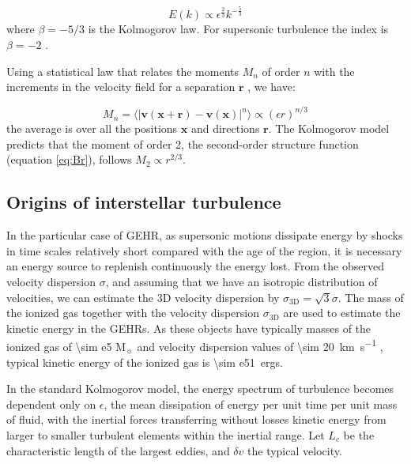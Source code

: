 \documentclass[fleqn,usenatbib, useAMS, a4paper]{mnras}
\begin{document}
\begin{equation}\label{eq:kolmogorov-law}
E(k) \propto \epsilon^\frac{2}{3} k^{-\frac{5}{3}}
\end{equation}
%
where \(\beta = -5 / 3\) is the Kolmogorov law.
For supersonic turbulence the index is $\beta=-2$ \citep{burg}. 

Using a statistical law that relates the moments \(M_n\) of order \(n\) with the increments in the velocity field for a separation \(\boldsymbol{r}\) \citep{Leqism}, we have:

\begin{equation}\label{eq:velocity-moments}
M_n = \langle \vert \boldsymbol{v}(\boldsymbol{x} + \boldsymbol{r})- \boldsymbol{v}(\boldsymbol{x})\vert^n \rangle \propto (\epsilon r)^{n/3}
\end{equation}
%
the average is over all the positions \(\boldsymbol{x}\) and directions \(\boldsymbol{r}\). 
The Kolmogorov model predicts that the moment of order 2, the second-order structure function (equation \ref{eq:Br}), follows \(M_2 \propto r^{2/3}\).

\subsection{Origins of interstellar turbulence}\label{sec:origins-turbulence}

In the particular case of GEHR, as supersonic motions dissipate energy by shocks in time scales relatively short compared with the age of the region, it is necessary an energy source to replenish continuously the energy lost. From the observed velocity  dispersion \(\sigma\), and assuming that we have an isotropic distribution of velocities,  we can estimate the 3D velocity dispersion by \(\sigma_\mathrm{3D} = \sqrt{3} \sigma\). The mass of the ionized gas together with the velocity dispersion \(\sigma_\mathrm{3D}\)  are used to estimate the kinetic energy in the GEHRs. As these objects have typically  masses of the ionized gas of \num{\sim e5} M\(_{\sun}\) and velocity dispersion values  of \SI{\sim 20}{km.s^{-1}} \citep{1984ApJ...287..116K}, typical kinetic energy of the ionized gas is \SI{\sim e51}{ergs}. 

In the standard Kolmogorov model, the energy spectrum of turbulence becomes dependent only on \(\epsilon\), the mean dissipation of energy per unit time per unit mass of fluid,  with the inertial forces transferring without losses kinetic energy from larger to smaller turbulent elements within the inertial range. Let \(L_c\) be the characteristic length of the largest eddies, and \(\delta v\) the typical velocity. 
\end{document}
